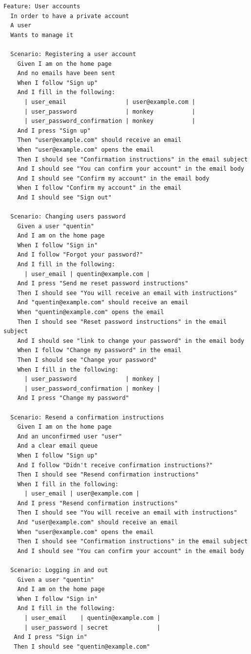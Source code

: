 \begin{lstlisting}[label={code.cukes}]
Feature: User accounts
  In order to have a private account
  A user
  Wants to manage it

  Scenario: Registering a user account
    Given I am on the home page
    And no emails have been sent
    When I follow "Sign up"
    And I fill in the following:
      | user_email                 | user@example.com |
      | user_password              | monkey           |
      | user_password_confirmation | monkey           |
    And I press "Sign up"
    Then "user@example.com" should receive an email
    When "user@example.com" opens the email
    Then I should see "Confirmation instructions" in the email subject
    And I should see "You can confirm your account" in the email body
    And I should see "Confirm my account" in the email body
    When I follow "Confirm my account" in the email
    And I should see "Sign out"

  Scenario: Changing users password
    Given a user "quentin"
    And I am on the home page
    When I follow "Sign in"
    And I follow "Forgot your password?"
    And I fill in the following:
      | user_email | quentin@example.com |
    And I press "Send me reset password instructions"
    Then I should see "You will receive an email with instructions"
    And "quentin@example.com" should receive an email
    When "quentin@example.com" opens the email
    Then I should see "Reset password instructions" in the email subject
    And I should see "link to change your password" in the email body
    When I follow "Change my password" in the email
    Then I should see "Change your password"
    When I fill in the following:
      | user_password              | monkey |
      | user_password_confirmation | monkey |
    And I press "Change my password"

  Scenario: Resend a confirmation instructions
    Given I am on the home page
    And an unconfirmed user "user"
    And a clear email queue
    When I follow "Sign up"
    And I follow "Didn't receive confirmation instructions?"
    Then I should see "Resend confirmation instructions"
    When I fill in the following:
      | user_email | user@example.com |
    And I press "Resend confirmation instructions"
    Then I should see "You will receive an email with instructions"
    And "user@example.com" should receive an email
    When "user@example.com" opens the email
    Then I should see "Confirmation instructions" in the email subject
    And I should see "You can confirm your account" in the email body

  Scenario: Logging in and out
    Given a user "quentin"
    And I am on the home page
    When I follow "Sign in"
    And I fill in the following:
      | user_email    | quentin@example.com |
      | user_password | secret              |
   And I press "Sign in"
   Then I should see "quentin@example.com"
\end{lstlisting}

